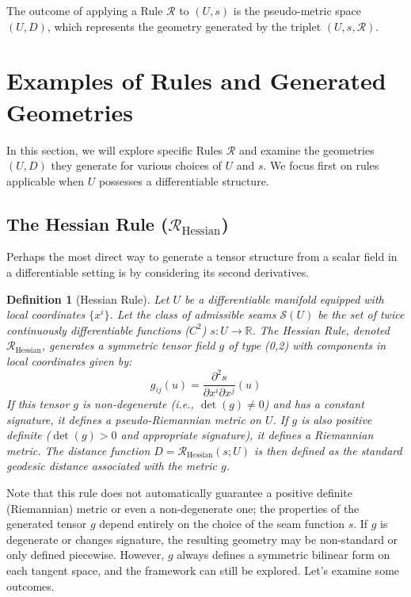 \documentclass[twoside,twocolumn]{article}
\newtheorem{definition}{Definition}[subsection] %
\begin{document}
The outcome of applying a Rule $\mathcal{R}$ to $(U, s)$ is the pseudo-metric space $(U, D)$, which represents the geometry generated by the triplet $(U, s, \mathcal{R})$.


\setcounter{equation}{0}
\section{Examples of Rules and Generated Geometries}

In this section, we will explore specific Rules $\mathcal{R}$ and examine the geometries $(U, D)$ they generate for various choices of $U$ and $s$. We focus first on rules applicable when $U$ possesses a differentiable structure.

\subsection{The Hessian Rule ($\mathcal{R}_{\text{Hessian}}$)}
\setcounter{definition}{0}

Perhaps the most direct way to generate a tensor structure from a scalar field in a differentiable setting is by considering its second derivatives.

\begin{definition}[Hessian Rule]
Let $U$ be a differentiable manifold equipped with local coordinates $\{x^i\}$. Let the class of admissible seams $\mathcal{S}(U)$ be the set of twice continuously differentiable functions ($C^2$) $s: U \to \mathbb{R}$. The \emph{Hessian Rule}, denoted $\mathcal{R}_{\text{Hessian}}$, generates a symmetric tensor field $g$ of type (0,2) with components in local coordinates given by:
\begin{equation}
g_{ij}(u) = \frac{\partial^2 s}{\partial x^i \partial x^j}(u)
\label{eq:hessian_rule}
\end{equation}
If this tensor $g$ is non-degenerate (i.e., $\det(g) \neq 0$) and has a constant signature, it defines a pseudo-Riemannian metric on $U$. If $g$ is also positive definite ($\det(g) > 0$ and appropriate signature), it defines a Riemannian metric. The distance function $D = \mathcal{R}_{\text{Hessian}}(s; U)$ is then defined as the standard geodesic distance associated with the metric $g$.
\end{definition}

\noindent Note that this rule does not automatically guarantee a positive definite (Riemannian) metric or even a non-degenerate one; the properties of the generated tensor $g$ depend entirely on the choice of the seam function $s$. If $g$ is degenerate or changes signature, the resulting geometry may be non-standard or only defined piecewise. However, $g$ always defines a symmetric bilinear form on each tangent space, and the framework can still be explored. Let's examine some outcomes.
\end{document}
